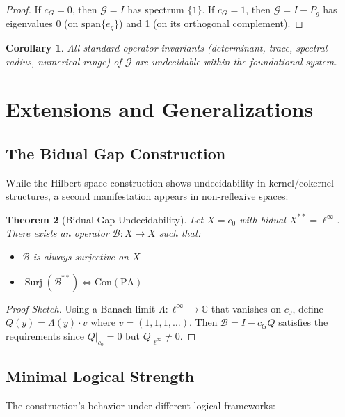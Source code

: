 \documentclass[11pt]{article}
\newtheorem{theorem}{Theorem}[section]
\newtheorem{corollary}[theorem]{Corollary}
\theoremstyle{definition}
\newcommand{\C}{\mathbb{C}}
\newcommand{\PA}{\mathrm{PA}}
\newcommand{\Con}{\mathrm{Con}}
\DeclareMathOperator{\Surj}{Surj}
\begin{document}
\begin{proof}
If $c_G = 0$, then $\mathcal{G} = I$ has spectrum $\{1\}$. If $c_G = 1$, then $\mathcal{G} = I - P_g$ has eigenvalues 0 (on $\text{span}\{e_g\}$) and 1 (on its orthogonal complement).
\end{proof}

\begin{corollary}
All standard operator invariants (determinant, trace, spectral radius, numerical range) of $\mathcal{G}$ are undecidable within the foundational system.
\end{corollary}

\section{Extensions and Generalizations}

\subsection{The Bidual Gap Construction}

While the Hilbert space construction shows undecidability in kernel/cokernel structures, a second manifestation appears in non-reflexive spaces:

\begin{theorem}[Bidual Gap Undecidability]\label{thm:bidual}
Let $X = c_0$ with bidual $X^{**} = \ell^\infty$. There exists an operator $\mathcal{B}: X \to X$ such that:
\begin{itemize}
\item $\mathcal{B}$ is always surjective on $X$
\item $\Surj(\mathcal{B}^{**}) \iff \Con(\PA)$
\end{itemize}
\end{theorem}

\begin{proof}[Proof Sketch]
Using a Banach limit $\Lambda: \ell^\infty \to \C$ that vanishes on $c_0$, define $Q(y) = \Lambda(y) \cdot v$ where $v = (1,1,1,\ldots)$. Then $\mathcal{B} = I - c_G Q$ satisfies the requirements since $Q|_{c_0} = 0$ but $Q|_{\ell^\infty} \neq 0$.
\end{proof}

\subsection{Minimal Logical Strength}

The construction's behavior under different logical frameworks:
\end{document}
